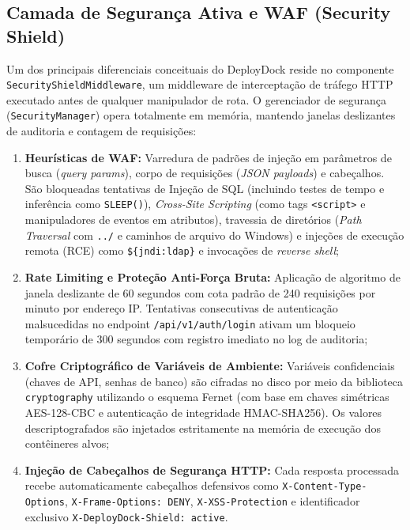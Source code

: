 \subsection{Camada de Segurança Ativa e WAF (Security Shield)}
\label{sec:security-shield}

Um dos principais diferenciais conceituais do DeployDock reside no componente
\texttt{SecurityShieldMiddleware}, um middleware de interceptação de tráfego HTTP executado antes de qualquer manipulador de rota. O gerenciador de segurança (\texttt{SecurityManager}) opera totalmente em memória, mantendo janelas deslizantes de auditoria e contagem de requisições:
\begin{enumerate}
    \item \textbf{Heurísticas de WAF:} Varredura de padrões de injeção em parâmetros de busca (\textit{query params}), corpo de requisições (\textit{JSON payloads}) e cabeçalhos. São bloqueadas tentativas de Injeção de SQL (incluindo testes de tempo e inferência como \texttt{SLEEP()}), \textit{Cross-Site Scripting} (como tags \texttt{<script>} e manipuladores de eventos em atributos), travessia de diretórios (\textit{Path Traversal} com \texttt{../} e caminhos de arquivo do Windows) e injeções de execução remota (RCE) como \texttt{\$\{jndi:ldap\}} e invocações de \textit{reverse shell};
    \item \textbf{Rate Limiting e Proteção Anti-Força Bruta:} Aplicação de algoritmo de janela deslizante de 60 segundos com cota padrão de 240 requisições por minuto por endereço IP. Tentativas consecutivas de autenticação malsucedidas no endpoint \texttt{/api/v1/auth/login} ativam um bloqueio temporário de 300 segundos com registro imediato no log de auditoria;
    \item \textbf{Cofre Criptográfico de Variáveis de Ambiente:} Variáveis confidenciais (chaves de API, senhas de banco) são cifradas no disco por meio da biblioteca \texttt{cryptography} utilizando o esquema Fernet (com base em chaves simétricas AES-128-CBC e autenticação de integridade HMAC-SHA256). Os valores descriptografados são injetados estritamente na memória de execução dos contêineres alvos;
    \item \textbf{Injeção de Cabeçalhos de Segurança HTTP:} Cada resposta processada recebe automaticamente cabeçalhos defensivos como \texttt{X-Content-Type-Options}, \texttt{X-Frame-Options: DENY}, \texttt{X-XSS-Protection} e identificador exclusivo \texttt{X-DeployDock-Shield: active}.
\end{enumerate}

